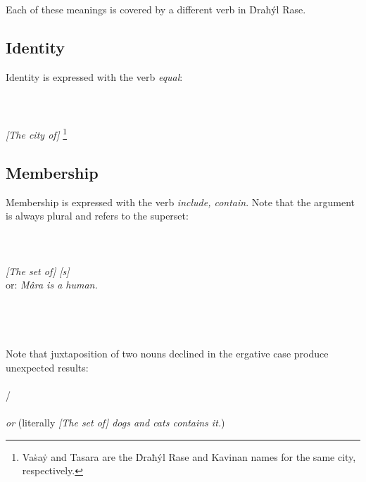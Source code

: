 \documentclass{book}
\begin{document}
Each of these meanings is covered by a different verb in Ḋraħýl Rase.

\subsection{Identity}

Identity is expressed with the verb  \emph{equal}: \\
~\\
   \\
   \\
\emph{[The city of]   }\footnote{Vaṡaẏ and Tasara are the Ḋraħýl Rase and Kavinan names for the same city, respectively.}

\subsection{Membership}

Membership is expressed with the verb  \emph{include, contain}. Note that the  argument is always plural and refers to the superset: \\
~\\
   \\
   \\
\emph{[The set of]  [s] } \\
or: \emph{Mâra is a human.} \\
~\\
   \\
   \\
\emph{  } \\

Note that juxtaposition of two nouns declined in the ergative case produce unexpected results: \\
~\\
 /   \\
   \\
  \emph{or}  (literally \emph{[The set of] dogs and cats contains it.})
\end{document}
